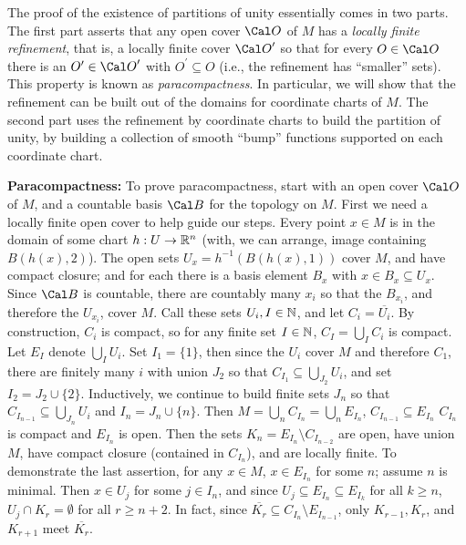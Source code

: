 The proof of the existence of partitions of unity essentially comes in two parts. The first part
asserts that any open cover ${\Cal O}$ of $M$ has a {\it locally finite refinement}, that is, a 
locally finite cover ${\Cal O}^\prime$ so that for every $O\in {\Cal O}$ there is an 
$O^\prime\in{\Cal O}^\prime$ with $O^\prime\subseteq O$ (i.e., the refinement has ``smaller'' sets).
This property is known as {\it paracompactness}. In particular, we will show that the refinement
can be built out of the domains for coordinate charts of $M$. The second part uses the 
refinement by coordinate charts to build the partition of unity, by building a collection of 
smooth ``bump'' functions supported on each coordinate chart.

\ssk

{\bf Paracompactness:} To prove paracompactness, start with an open cover $\Cal O$ of $M$, and a countable basis $\Cal B$
for the topology on $M$. First we need a locally 
finite open cover to help guide our steps. Every point $x\in M$ is in the domain of some 
chart $h:U\rightarrow {\Bbb R}^n$ (with, we can arrange, image containing $B(h(x),2)$). The 
open sets $U_x=h^{-1}(B(h(x),1))$ cover $M$, and have compact closure; and for each there is 
a basis element $B_x$ with $x\in B_x\subseteq U_x$. Since $\Cal B$ is countable, 
there are countably many $x_i$ so that the $B_{x_i}$, and therefore the $U_{x_i}$,
cover $M$. Call these sets $U_i, I\in {\Bbb N}$, and let $C_i=\overline{U_i}$. By construction,
$C_i$ is compact, so for any finite set $I\in{\Bbb N}$, $C_I=\bigcup_I C_i$ is compact. 
Let $E_I$ denote $\bigcup_I U_i$.
Set $I_1=\{1\}$, then since the $U_i$ cover $M$ and therefore $C_1$, there are finitely
many $i$ with union $J_2$ so that $C_{I_1}\subseteq \bigcup_{J_2}U_i$, and set $I_2=J_2\cup\{2\}$.
Inductively, we continue to build finite sets $J_n$ so that $C_{I_{n-1}}\subseteq \bigcup_{J_n}U_i$
and $I_n=J_n\cup\{n\}$. Then $M=\bigcup_n C_{I_n} = \bigcup_n E_{I_n}$, $C_{I_{n-1}}\subseteq E_{I_n}$
$C_{I_n}$ is compact and $E_{I_n}$ is open. Then the sets 
$K_n=E_{I_n}\setminus C_{I_{n-2}}$ are open, have union $M$, have compact closure (contained in $C_{I_n}$),
and are locally finite. To demonstrate
the last assertion, for any $x\in M$, 
$x\in E_{I_n}$ for some $n$; assume $n$ is minimal. Then $x\in U_j$ for some $j\in I_n$, and since
$U_j\subseteq E_{I_n}\subseteq E_{I_k}$ for all $k\geq n$, $U_j\cap K_r=\emptyset$ for all $r\geq n+2$.
In fact, since $\overline{K_r}\subseteq C_{I_n}\setminus E_{I_{n-1}}$, only $K_{r-1}, K_r$, and $K_{r+1}$
meet $\overline{K_r}$.

